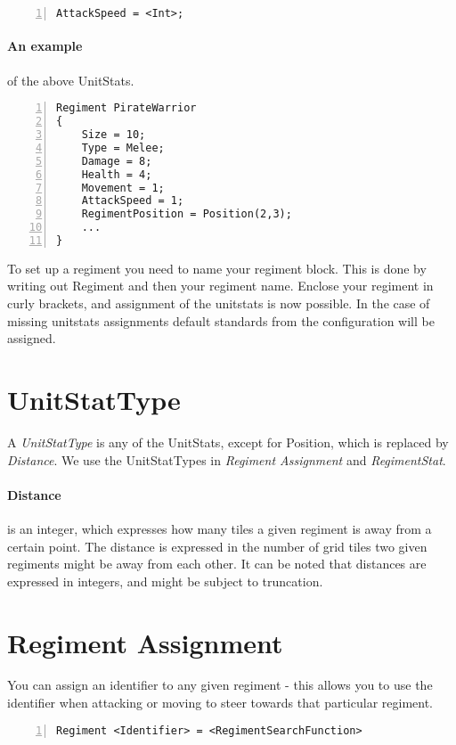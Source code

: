 		\begin{lstlisting}[basicstyle=\small\sffamily,
		keywordstyle={\color{blue}},
		comment={[l]{//}}, morecomment={[s]{/*}{*/}}, commentstyle=\itshape,
		columns={[l]flexible}, numbers=left, numberstyle=\tiny,
		frameround=fftt, frame=shadowbox, captionpos=b,
		caption={AttackSpeed of the regiment}]
AttackSpeed = <Int>;
			\end{lstlisting}
			
\paragraph{An example} of the above UnitStats.
		\begin{lstlisting}[basicstyle=\small\sffamily,
		keywordstyle={\color{blue}},
		comment={[l]{//}}, morecomment={[s]{/*}{*/}}, commentstyle=\itshape,
		columns={[l]flexible}, numbers=left, numberstyle=\tiny,
		frameround=fftt, frame=shadowbox, captionpos=b,
		caption={Example: Using the UnitStats}]
Regiment PirateWarrior
{
	Size = 10;
	Type = Melee;
	Damage = 8;
	Health = 4;
	Movement = 1;
	AttackSpeed = 1;
	RegimentPosition = Position(2,3);
	...
}
\end{lstlisting}
To set up a regiment you need to name your regiment block. This is done by writing out Regiment and then your regiment name. Enclose your regiment in curly brackets, and assignment of the unitstats is now possible. In the case of missing unitstats assignments default standards from the configuration will be assigned.

\section{UnitStatType}
	A {\it UnitStatType} is any of the UnitStats, except for Position, which is replaced by {\it Distance}. We use the UnitStatTypes in 
	{\it Regiment Assignment} and {\it RegimentStat}.
	\paragraph{Distance} is an integer, which expresses how many tiles a given regiment is away from a certain point.
	The distance is expressed in the number of grid tiles two given regiments might be away from each other. It can be noted that distances are expressed in integers, and might be subject to truncation.

\section{Regiment Assignment}
\label{doc:regass}
	You can assign an identifier to any given regiment - this allows you to use the identifier when attacking or moving to steer towards that particular regiment.
		\begin{lstlisting}[basicstyle=\small\sffamily, keywordstyle={\color{blue}}, comment={[l]{//}}, morecomment={[s]{/*}{*/}}, commentstyle=\itshape, columns={[l]flexible}, numbers=left, numberstyle=\tiny, frameround=fftt, frame=shadowbox, captionpos=b,
		caption={Regiment Assignment}]
Regiment <Identifier> = <RegimentSearchFunction>			
		\end{lstlisting}	


